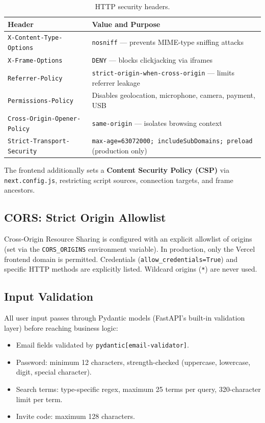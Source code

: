 \begin{table}[ht]
\centering
\caption{HTTP security headers.}
\label{tab:headers}
\small
\begin{tabularx}{\textwidth}{@{} l X @{}}
\toprule
\textbf{Header} & \textbf{Value and Purpose} \\
\midrule
\texttt{X-Content-Type-Options} &
  \texttt{nosniff} --- prevents MIME-type sniffing attacks \\
\texttt{X-Frame-Options} &
  \texttt{DENY} --- blocks clickjacking via iframes \\
\texttt{Referrer-Policy} &
  \texttt{strict-origin-when-cross-origin} --- limits referrer leakage \\
\texttt{Permissions-Policy} &
  Disables geolocation, microphone, camera, payment, USB \\
\texttt{Cross-Origin-Opener-Policy} &
  \texttt{same-origin} --- isolates browsing context \\
\texttt{Strict-Transport-Security} &
  \texttt{max-age=63072000; includeSubDomains; preload} (production only) \\
\bottomrule
\end{tabularx}
\end{table}

The frontend additionally sets a \textbf{Content Security Policy (CSP)} via
\texttt{next.config.js}, restricting script sources, connection targets, and
frame ancestors.

\subsection{CORS: Strict Origin Allowlist}

Cross-Origin Resource Sharing is configured with an explicit allowlist of
origins (set via the \texttt{CORS\_ORIGINS} environment variable). In
production, only the Vercel frontend domain is permitted. Credentials
(\texttt{allow\_credentials=True}) and specific HTTP methods are explicitly
listed. Wildcard origins (\texttt{*}) are never used.

\subsection{Input Validation}

All user input passes through Pydantic models (FastAPI's built-in validation
layer) before reaching business logic:

\begin{itemize}[nosep]
  \item Email fields validated by \texttt{pydantic[email-validator]}.
  \item Password: minimum 12 characters, strength-checked (uppercase,
        lowercase, digit, special character).
  \item Search terms: type-specific regex, maximum 25 terms per query,
        320-character limit per term.
  \item Invite code: maximum 128 characters.
\end{itemize}

